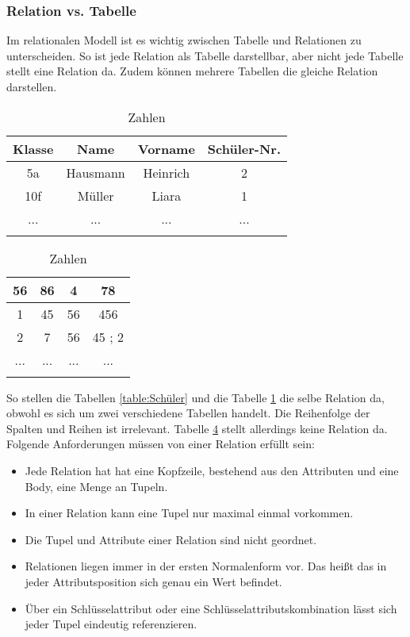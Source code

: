 \documentclass[12pt, a4paper, twoside]{article}
\begin{document}
	\subsubsection{Relation vs. Tabelle}
		Im relationalen Modell ist es wichtig zwischen Tabelle und Relationen zu unterscheiden. So ist jede Relation als Tabelle darstellbar, aber nicht jede Tabelle stellt eine Relation da. Zudem können mehrere Tabellen die gleiche Relation darstellen.
				\cite{Meier:SQLNoSQLDatenbanken}
		\begin{table}[H]
			\begin{minipage}{.5\textwidth}
				\begin{longtable}{|c|c|c|c|}
					\hline
					Klasse & Name & Vorname & Schüler-Nr.  \\
					\hline
					5a & Hausmann & Heinrich & 2 \\
					\hline
					10f  & Müller & Liara &1 \\
					\hline
					... & ... & ... & ... \\
					\hline
					\caption{SCHÜLER}
					\label{table:Schüler:flipped}
				\end{longtable}
			\end{minipage}
			\begin{minipage}{.5\textwidth}
				\begin{longtable}{|c|c|c|c|}
					\hline
					56 & 86 & 4 & 78 \\
					\hline
					1 & 45 & 56 & 456 \\
					\hline
					2 & 7 & 56 & 45 ; 2\\
					\hline
					... & ... & ... & ... \\
					\hline
					\caption{Zahlen}
					\label{table:Zahlen}
				\end{longtable}
			\end{minipage}
		\end{table}

		So stellen die Tabellen \ref{table:Schüler} und die Tabelle \ref{table:Schüler:flipped} die selbe Relation da, obwohl es sich um zwei verschiedene Tabellen handelt. Die Reihenfolge der Spalten und Reihen ist irrelevant. Tabelle \ref{table:Zahlen} stellt allerdings keine Relation da.
		\cite{darwen2009introduction}\\
		Folgende Anforderungen müssen von einer Relation erfüllt sein:
		\begin{itemize}
			\item Jede Relation hat hat eine Kopfzeile, bestehend aus den Attributen und eine Body, eine Menge an Tupeln.
			\item In einer Relation kann eine Tupel nur maximal einmal vorkommen.
			\item Die Tupel und Attribute einer Relation sind nicht geordnet.
			\item Relationen liegen immer in der ersten Normalenform vor. Das heißt das in jeder Attributsposition sich genau ein Wert befindet.
			\item Über ein Schlüsselattribut oder eine Schlüsselattributskombination lässt sich jeder Tupel eindeutig referenzieren.
		\end{itemize}
	
\end{document}

